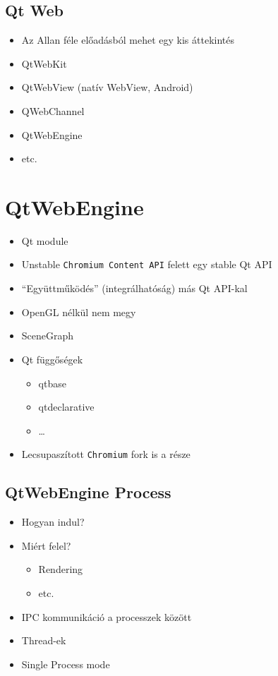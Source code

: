 \documentclass[12pt]{report}
\begin{document}
\subsection{Qt Web}
\begin{itemize}
    \item Az Allan féle előadásból mehet egy kis áttekintés
    \item QtWebKit
    \item QtWebView (natív WebView, Android)
    \item QWebChannel
    \item QtWebEngine
    \item etc.
\end{itemize}

\section{QtWebEngine}
\begin{itemize}
    \item Qt module
    \item Unstable \texttt{Chromium Content API} felett egy stable Qt API
    \item ``Együttműködés'' (integrálhatóság) más Qt API-kal
    \item OpenGL nélkül nem megy
    \item SceneGraph
    \item Qt függőségek
        \begin{itemize}
            \item qtbase
            \item qtdeclarative
            \item \dots
        \end{itemize}
    \item Lecsupaszított \texttt{Chromium} fork is a része
\end{itemize}

\subsection{QtWebEngine Process}
\begin{itemize}
    \item Hogyan indul?
    \item Miért felel?
        \begin{itemize}
            \item Rendering
            \item etc.
        \end{itemize}
    \item IPC kommunikáció a processzek között
    \item Thread-ek
    \item Single Process mode
\end{itemize}
\end{document}
